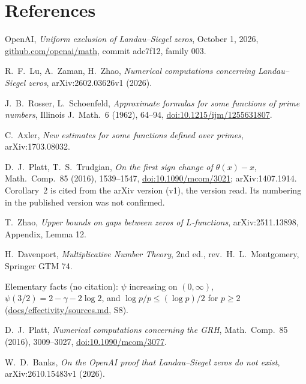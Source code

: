 \documentclass[11pt]{article}
\begin{document}
\section*{References}
\begin{enumerate}[label={[S\arabic*]}]
\item OpenAI, \emph{Uniform exclusion of Landau--Siegel zeros}, October 1, 2026, \url{github.com/openai/math}, commit adc7f12, family 003.
\item R.~F.~Lu, A.~Zaman, H.~Zhao, \emph{Numerical computations concerning Landau--Siegel zeros}, arXiv:2602.03626v1 (2026).
\item J.~B.~Rosser, L.~Schoenfeld, \emph{Approximate formulas for some functions of prime numbers}, Illinois J.\ Math.\ 6 (1962), 64--94, \url{doi:10.1215/ijm/1255631807}.
\item C.~Axler, \emph{New estimates for some functions defined over primes}, arXiv:1703.08032.
\item D.~J.~Platt, T.~S.~Trudgian, \emph{On the first sign change of $\theta(x)-x$}, Math.\ Comp.\ 85 (2016), 1539--1547, \url{doi:10.1090/mcom/3021}; arXiv:1407.1914. Corollary~2 is cited from the arXiv version (v1), the version read. Its numbering in the published version was not confirmed.
\item T.~Zhao, \emph{Upper bounds on gaps between zeros of $L$-functions}, arXiv:2511.13898, Appendix, Lemma 12.
\item H.~Davenport, \emph{Multiplicative Number Theory}, 2nd ed., rev.\ H.~L.~Montgomery, Springer GTM 74.
\item Elementary facts (no citation): $\psi$ increasing on $(0,\infty)$, $\psi(3/2)=2-\gamma-2\log2$, and $\log p/p\le(\log p)/2$ for $p\ge2$ (\url{docs/effectivity/sources.md}, S8).
\item D.~J.~Platt, \emph{Numerical computations concerning the GRH}, Math.\ Comp.\ 85 (2016), 3009--3027, \url{doi:10.1090/mcom/3077}.
\item W.~D.~Banks, \emph{On the OpenAI proof that Landau--Siegel zeros do not exist}, arXiv:2610.15483v1 (2026).
\end{enumerate}
\end{document}
